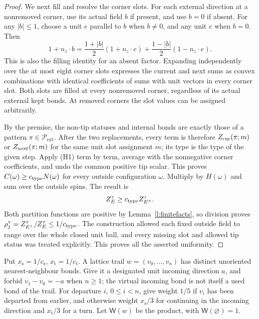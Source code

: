\begin{proof}
We next fill and resolve the corner slots. For each external
direction at a nonremoved corner, use its actual field
\(b\) if present, and use \(b=0\) if absent.
For any \(|b|\le1\), choose a unit \(e\) parallel to \(b\)
when \(b\ne0\), and any unit \(e\) when \(b=0\). Then
\[
 1+n_z\cdot b
 =\frac{1+|b|}{2}(1+n_z\cdot e)
       +\frac{1-|b|}{2}(1-n_z\cdot e).
\]
This is also the filling identity for an absent factor.
Expanding independently over the at most eight corner slots
expresses the current and next sums as convex combinations
with identical coefficients of sums with unit vectors in every
corner slot. Both slots are filled at every nonremoved corner,
regardless of its actual external kept bonds.
At removed corners the slot values can be assigned arbitrarily.

By the premise, the non-tip statuses and internal bonds are
exactly those of a pattern \(\pi\in\mathcal P_{\mathrm{ext}}\).
After the two replacements, every term is therefore
\(Z_{\rm cur}(\pi;m)\) or \(Z_{\rm next}(\pi;m)\) for the same
unit slot assignment \(m\); its type is the type of the given
step. Apply (H1) term by term, average with the nonnegative
corner coefficients, and undo the common positive tip scalar.
This proves
\(C(\omega)\ge c_{\rm type}N(\omega)\)
for every outside configuration \(\omega\).
Multiply by \(H(\omega)\) and sum over the outside spins.
The result is
\[
 Z_E^\tau\ge c_{\rm type}Z_{E^+}^\tau.
\]
Both partition functions are positive by
Lemma~\ref{l:finitefacts}, so division proves
\(\rho_j^\tau=Z_{E^+}^\tau/Z_E^\tau\le1/c_{\rm type}\).
The construction allowed each fixed outside field to range
over the whole closed unit ball, and every missing slot and
allowed tip status was treated explicitly. This proves all
the asserted uniformity.
\end{proof}

\begin{definition}\label{d:weights}
Put \(x_{\mathrm s}=1/c_{\mathrm s}\), \(x_{\mathrm t}=1/c_{\mathrm t}\).
A lattice trail \(w=(v_0,\ldots,v_n)\) has distinct unoriented
nearest-neighbour bonds. Give it a designated unit incoming direction
\(a\), and forbid \(v_1-v_0=-a\) when \(n\ge1\); the virtual
incoming bond is not itself a used bond of the trail.
For departure \(i\), \(0\le i<n\), give weight \(1/5\) if \(v_i\)
has been departed from earlier, and otherwise weight \(x_{\mathrm s}/3\)
for continuing in the incoming direction and \(x_{\mathrm t}/3\)
for a turn. Let \(\mathsf W(w)\) be the product, with
\(\mathsf W(\varnothing)=1\).
\end{definition}


